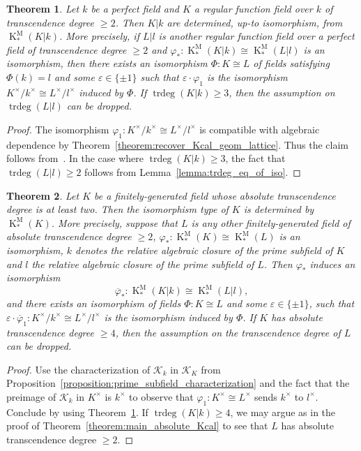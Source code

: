 \documentclass[12pt]{amsart}
\newcommand{\KM}{\operatorname{K}^\mathrm{M}}
\newcommand{\trdeg}{\operatorname{trdeg}}
\newcommand{\Kcal}{\mathcal{K}}
\renewcommand{\bar}{\overline}
\renewcommand{\epsilon}{\varepsilon}
\renewcommand{\phi}{\varphi}
\newtheorem{theorem}{Theorem}[section]
\theoremstyle{definition}
\begin{document}
\begin{theorem}\label{theorem:fg_case_relative}
  Let $k$ be a perfect field and $K$ a regular function field over $k$ of transcendence degree $\geq 2$.
  Then $K|k$ are determined, up-to isomorphism, from $\KM_{*}(K|k)$.
  More precisely, if $L|l$ is another regular function field over a perfect field of transcendence degree $\geq 2$ and $\phi_{*} : \KM_{*}(K|k) \cong \KM_{*}(L|l)$ is an isomorphism, then there exists an isomorphism $\Phi : K \cong L$ of fields satisfying $\Phi(k) = l$ and some $\epsilon \in \{\pm 1\}$ such that $\epsilon \cdot \phi_{1}$ is the isomorphism $K^{\times}/k^{\times} \cong L^{\times}/l^{\times}$ induced by $\Phi$.
  If $\trdeg(K|k) \geq 3$, then the assumption on $\trdeg(L|l)$ can be dropped.
\end{theorem}
\begin{proof}
  The isomorphism $\phi_{1} : K^{\times}/k^{\times} \cong L^{\times}/l^{\times}$ is compatible with algebraic dependence by Theorem~\ref{theorem:recover_Kcal_geom_lattice}.
  Thus the claim follows from~\cite[Theorem 4]{zbMATH07463742}.
  In the case where $\trdeg(K|k) \geq 3$, the fact that $\trdeg(L|l) \geq 2$ follows from Lemma~\ref{lemma:trdeg_eq_of_iso}.
\end{proof}

\begin{theorem}\label{theorem:fg_case_absolute}
  Let $K$ be a finitely-generated field whose absolute transcendence degree is at least two.
  Then the isomorphism type of $K$ is determined by $\KM_{*}(K)$.
  More precisely, suppose that $L$ is any other finitely-generated field of absolute transcendence degree $\geq 2$, $\phi_{*} : \KM_{*}(K) \cong \KM_{*}(L)$ is an isomorphism, $k$ denotes the relative algebraic closure of the prime subfield of $K$ and $l$ the relative algebraic closure of the prime subfield of $L$.
  Then $\phi_{*}$ induces an isomorphism
  \[ \bar\phi_{*} : \KM_{*}(K|k) \cong \KM_{*}(L|l), \]
  and there exists an isomorphism of fields $\Phi : K \cong L$ and some $\epsilon \in \{\pm 1\}$, such that $\epsilon \cdot \bar\phi_{1} : K^{\times}/k^{\times} \cong L^{\times}/l^{\times}$ is the isomorphism induced by $\Phi$.
  If $K$ has absolute transcendence degree $\geq 4$, then the assumption on the transcendence degree of $L$ can be dropped.
\end{theorem}
\begin{proof}
  Use the characterization of $\Kcal_{k}$ in $\Kcal_{K}$ from Proposition~\ref{proposition:prime_subfield_characterization} and the fact that the preimage of $\Kcal_{k}$ in $K^{\times}$ is $k^{\times}$ to observe that $\phi_{1} : K^{\times} \cong L^{\times}$ sends $k^{\times}$ to $l^{\times}$.
  Conclude by using Theorem~\ref{theorem:fg_case_relative}.
  If $\trdeg(K|k) \geq 4$, we may argue as in the proof of Theorem~\ref{theorem:main_absolute_Kcal} to see that $L$ has absolute transcendence degree $\geq 2$.
\end{proof}



\end{document}
